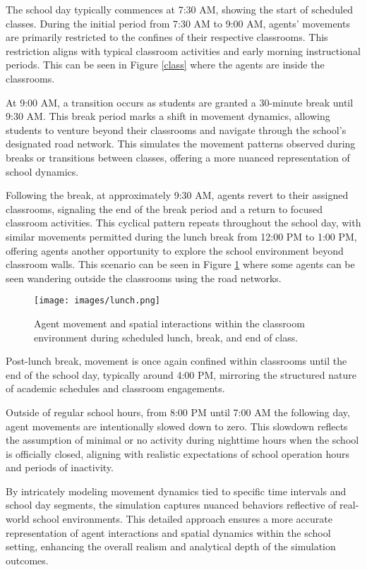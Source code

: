  The school day typically commences at 7:30 AM, showing the start of scheduled classes. During the initial period from 7:30 AM to 9:00 AM, agents' movements are primarily restricted to the confines of their respective classrooms. This restriction aligns with typical classroom activities and early morning instructional periods. This can be seen in Figure \ref{class} where the agents are inside the classrooms.
 
 
 At 9:00 AM, a transition occurs as students are granted a 30-minute break until 9:30 AM. This break period marks a shift in movement dynamics, allowing students to venture beyond their classrooms and navigate through the school's designated road network. This simulates the movement patterns observed during breaks or transitions between classes, offering a more nuanced representation of school dynamics.
 
 
 Following the break, at approximately 9:30 AM, agents revert to their assigned classrooms, signaling the end of the break period and a return to focused classroom activities. This cyclical pattern repeats throughout the school day, with similar movements permitted during the lunch break from 12:00 PM to 1:00 PM, offering agents another opportunity to explore the school environment beyond classroom walls. This scenario can be seen in Figure \ref{lunch} where some agents can be seen wandering outside the classrooms using the road networks.
 \begin{figure}[H]
 	\centering
 	\texttt{[image: images/lunch.png]}
 	\caption{    Agent movement and spatial interactions within the classroom environment during scheduled lunch, break, and end of class.}
 	\label{lunch}
 \end{figure}
 Post-lunch break, movement is once again confined within classrooms until the end of the school day, typically around 4:00 PM, mirroring the structured nature of academic schedules and classroom engagements.
 
 
 Outside of regular school hours, from 8:00 PM until 7:00 AM the following day, agent movements are intentionally slowed down to zero. This slowdown reflects the assumption of minimal or no activity during nighttime hours when the school is officially closed, aligning with realistic expectations of school operation hours and periods of inactivity.
 
 By intricately modeling movement dynamics tied to specific time intervals and school day segments, the simulation captures nuanced behaviors reflective of real-world school environments. This detailed approach ensures a more accurate representation of agent interactions and spatial dynamics within the school setting, enhancing the overall realism and analytical depth of the simulation outcomes.
 
